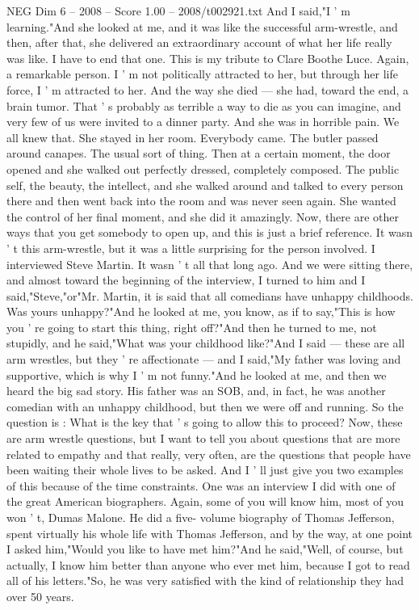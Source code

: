 \begin{textsample}{NEG Dim 6 – 2008 – Score 1.00 – 2008/t002921.txt}
And I said,"I ' m learning."And she looked at me, and it was like the successful arm-wrestle, and then, after that, she delivered an extraordinary account of what her life really was like.
I have to end that one.
This is my tribute to Clare Boothe Luce.
Again, a remarkable person.
I ' m not politically attracted to her, but through her life force, I ' m attracted to her.
And the way she died — she had, toward the end, a brain tumor.
That ' s probably as terrible a way to die as you can imagine, and very few of us were invited to a dinner party.
And she was in horrible pain.
We all knew that.
She stayed in her room.
Everybody came.
The butler passed around canapes.
The usual sort of thing.
Then at a certain moment, the door opened and she walked out perfectly dressed, completely composed.
The public self, the beauty, the intellect, and she walked around and talked to every person there and then went back into the room and was never seen again.
She wanted the control of her final moment, and she did it amazingly.
Now, there are other ways that you get somebody to open up, and this is just a brief reference.
It wasn ' t this arm-wrestle, but it was a little surprising for the person involved.
I interviewed Steve Martin.
It wasn ' t all that long ago.
And we were sitting there, and almost toward the beginning of the interview, I turned to him and I said,"Steve,"or"Mr.
Martin, it is said that all comedians have unhappy childhoods.
Was yours unhappy?"And he looked at me, you know, as if to say,"This is how you ' re going to start this thing, right off?"And then he turned to me, not stupidly, and he said,"What was your childhood like?"And I said — these are all arm wrestles, but they ' re affectionate — and I said,"My father was loving and supportive, which is why I ' m not funny."And he looked at me, and then we heard the big sad story.
His father was an SOB, and, in fact, he was another comedian with an unhappy childhood, but then we were off and running.
So the question is : What is the key that ' s going to allow this to proceed?
Now, these are arm wrestle questions, but I want to tell you about questions that are more related to empathy and that really, very often, are the questions that people have been waiting their whole lives to be asked.
And I ' ll just give you two examples of this because of the time constraints.
One was an interview I did with one of the great American biographers.
Again, some of you will know him, most of you won ' t, Dumas Malone.
He did a five- volume biography of Thomas Jefferson, spent virtually his whole life with Thomas Jefferson, and by the way, at one point I asked him,"Would you like to have met him?"And he said,"Well, of course, but actually, I know him better than anyone who ever met him, because I got to read all of his letters."So, he was very satisfied with the kind of relationship they had over 50 years.

\end{textsample}
